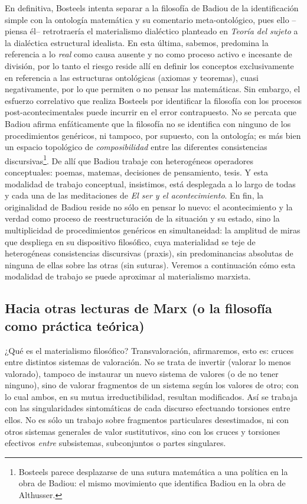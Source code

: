 En definitiva, Bosteels intenta separar a la filosofía de Badiou de la identificación simple con la ontología matemática y su comentario meta-ontológico, pues ello --piensa él-- retrotraería el materialismo dialéctico planteado en \emph{Teoría del sujeto} a la dialéctica estructural idealista. En esta última, sabemos, predomina la referencia a lo \emph{real} como causa ausente y no como proceso activo e incesante de división, por lo tanto el riesgo reside allí en definir los conceptos exclusivamente en referencia a las estructuras ontológicas (axiomas y teoremas), cuasi negativamente, por lo que permiten o no pensar las matemáticas. Sin embargo, el esfuerzo correlativo que realiza Bosteels por identificar la filosofía con los procesos post-acontecimentales puede incurrir en el error contrapuesto. No se percata que Badiou afirma enfáticamente que la filosofía no se identifica con ninguno de los procedimientos genéricos, ni tampoco, por supuesto, con la ontología; es más bien un espacio topológico de \emph{composibilidad} entre las diferentes consistencias discursivas\footnote{Bosteels parece desplazarse de una sutura matemática a una política en la obra de Badiou: el mismo movimiento que identifica Badiou en la obra de Althusser.}. De allí que Badiou trabaje con heterogéneos operadores conceptuales: poemas, matemas, decisiones de pensamiento, tesis. Y esta modalidad de trabajo conceptual, insistimos, está desplegada a lo largo de todas y cada una de las meditaciones de \emph{El ser y el acontecimiento}. En fin, la originalidad de Badiou reside no sólo en pensar lo nuevo: el acontecimiento y la verdad como proceso de reestructuración de la situación y su estado, sino la multiplicidad de procedimientos genéricos en simultaneidad: la amplitud de miras que despliega en su dispositivo filosófico, cuya materialidad se teje de heterogéneas consistencias discursivas (praxis), sin predominancias absolutas de ninguna de ellas sobre las otras (sin suturas). Veremos a continuación cómo esta modalidad de trabajo se puede aproximar al materialismo marxista.

\subsection{Hacia otras lecturas de Marx (o la filosofía como práctica teórica)}

¿Qué es el materialismo filosófico? Transvaloración, afirmaremos, esto es: cruces entre distintos sistemas de valoración. No se trata de invertir (valorar lo menos valorado), tampoco de instaurar un nuevo sistema de valores (o de no tener ninguno), sino de valorar fragmentos de un sistema según los valores de otro; con lo cual ambos, en su mutua irreductibilidad, resultan modificados. Así se trabaja con las singularidades sintomáticas de cada discurso efectuando torsiones entre ellos. No es sólo un trabajo sobre fragmentos particulares desestimados, ni con otros sistemas generales de valor sustitutivos, sino con los cruces y torsiones efectivos \emph{entre} subsistemas, subconjuntos o partes singulares.

